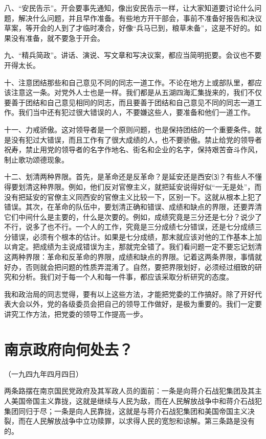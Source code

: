 \documentclass[UTF-8, a5paper, 12pt]{ctexart}
\begin{document}
八、“安民告示”。开会要事先通知，像出安民告示一样，让大家知道要讨论什么问题，解决什么问题，并且早作准备。有些地方开干部会，事前不准备好报告和决议草案，等开会的人到了才临时凑合，好像“兵马已到，粮草未备”，这是不好的。如果没有准备，就不要急于开会。

九、“精兵简政”。讲话、演说、写文章和写决议案，都应当简明扼要。会议也不要开得太长。

十、注意团结那些和自己意见不同的同志一道工作。不论在地方上或部队里，都应该注意这一条。对党外人士也是一样。我们都是从五湖四海汇集拢来的，我们不仅要善于团结和自己意见相同的同志，而且要善于团结和自己意见不同的同志一道工作。我们当中还有犯过很大错误的人，不要嫌这些人，要准备和他们一道工作。

十一、力戒骄傲。这对领导者是一个原则问题，也是保持团结的一个重要条件。就是没有犯过大错误，而且工作有了很大成绩的人，也不要骄傲。禁止给党的领导者祝寿，禁止用党的领导者的名字作地名、街名和企业的名字，保持艰苦奋斗作风，制止歌功颂德现象。

十二、划清两种界限。首先，是革命还是反革命？是延安还是西安⑶？有些人不懂得要划清这种界限。例如，他们反对官僚主义，就把延安说得好似“一无是处”，而没有把延安的官僚主义同西安的官僚主义比较一下，区别一下。这就从根本上犯了错误。其次，在革命的队伍中，要划清正确和错误、成绩和缺点的界限，还要弄清它们中间什么是主要的，什么是次要的。例如，成绩究竟是三分还是七分？说少了不行，说多了也不行。一个人的工作，究竟是三分成绩七分错误，还是七分成绩三分错误，必须有个根本的估计。如果是七分成绩，那末就应该对他的工作基本上加以肯定。把成绩为主说成错误为主，那就完全错了。我们看问题一定不要忘记划清这两种界限：革命和反革命的界限，成绩和缺点的界限。记着这两条界限，事情就好办，否则就会把问题的性质弄混淆了。自然，要把界限划好，必须经过细致的研究和分析。我们对于每一个人和每一件事，都应该采取分析研究的态度。

我和政治局的同志觉得，要有以上这些方法，才能把党委的工作搞好。除了开好代表大会以外，党的各级委员会把自己的领导工作做好，是极为重要的。我们一定要讲究工作方法，把党委的领导工作提高一步。

\section{南京政府向何处去？}

（一九四九年四月四日）

两条路摆在南京国民党政府及其军政人员的面前：一条是向蒋介石战犯集团及其主人美国帝国主义靠拢，这就是继续与人民为敌，而在人民解放战争中和蒋介石战犯集团同归于尽；一条是向人民靠拢，这就是与蒋介石战犯集团和美国帝国主义决裂，而在人民解放战争中立功赎罪，以求得人民的宽恕和谅解。第三条路是没有的。
\end{document}
